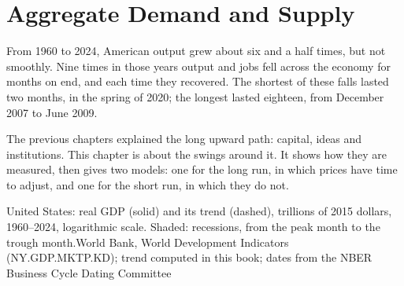\chapter{Aggregate Demand and Supply}\label{ch:g12:aggregate-demand-and-supply}

From 1960 to 2024, American output grew about six and a half times, but not smoothly. Nine times in those years output and jobs fell across the economy for months on
end, and each time they recovered. The shortest of these falls lasted two months, in the spring of 2020; the longest lasted eighteen, from December 2007 to June 2009.

The previous chapters explained the long upward path: capital, ideas and institutions. This chapter is about the swings around it. It shows how they are measured, then
gives two models: one for the long run, in which prices have time to adjust, and one for the short run, in which they do not.

\begin{openingchart}{United States: real GDP (solid) and its trend (dashed), trillions of 2015 dollars, 1960--2024, logarithmic scale. Shaded: recessions, from the
peak month to the trough month.}{World Bank, World Development Indicators (NY.GDP.MKTP.KD); trend computed in this book;  dates from the NBER Business Cycle
Dating Committee}
\end{openingchart}

